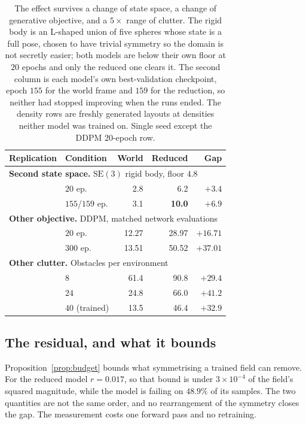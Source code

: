 \documentclass[10pt,twocolumn,letterpaper]{article}
\newcommand{\toprule}{\hline}
\newcommand{\midrule}{\hline}
\newcommand{\bottomrule}{\hline}}
\newcommand{\SE}{\mathrm{SE}(3)}
\begin{document}
\begin{table}[t]
\centering
\footnotesize
\setlength{\tabcolsep}{3.5pt}
\begin{tabular}{@{}llrrr@{}}
\toprule
Replication & Condition & World & Reduced & Gap \\
\midrule
\multicolumn{5}{l}{\textbf{Second state space.} $\SE$ rigid body, floor $4.8$}\\
            & $20$ ep.       & 2.8 & 6.2 & $+3.4$ \\
            & $155$/$159$ ep.& 3.1 & \textbf{10.0} & $+6.9$ \\
\midrule
\multicolumn{5}{l}{\textbf{Other objective.} DDPM, matched network evaluations}\\
            & $20$ ep.       & 12.27 & 28.97 & $+16.71$ \\
            & $300$ ep.      & 13.51 & 50.52 & $\mathbf{+37.01}$ \\
\midrule
\multicolumn{5}{l}{\textbf{Other clutter.} Obstacles per environment}\\
            & $8$            & 61.4 & 90.8 & $+29.4$ \\
            & $24$           & 24.8 & 66.0 & $\mathbf{+41.2}$ \\
            & $40$ (trained) & 13.5 & 46.4 & $+32.9$ \\
\bottomrule
\end{tabular}
\caption{The effect survives a change of state space, a change of generative
objective, and a $5\times$ range of clutter. The rigid body is an L-shaped union
of five spheres whose state is a full pose, chosen to have trivial symmetry so
the domain is not secretly easier; both models are below their own floor at $20$
epochs and only the reduced one clears it. The second column is each model's
own best-validation checkpoint, epoch $155$ for the world frame and $159$ for the
reduction, so neither had stopped improving when the runs ended. The density rows are freshly generated
layouts at densities neither model was trained on. Single seed except the DDPM
$20$-epoch row.}
\label{tab:replications}
\end{table}

\subsection{The residual, and what it bounds}
\label{sec:residual}
Proposition~\ref{prop:budget} bounds what symmetrising a trained field can
remove. For the reduced model $r = 0.017$, so that bound is under $3\times10^{-4}$ of the
field's squared magnitude, while the model is failing on $48.9\%$ of its
samples. The two quantities are not the same order, and no rearrangement of the
symmetry closes the gap. The measurement costs one forward pass and no
retraining.
\end{document}
